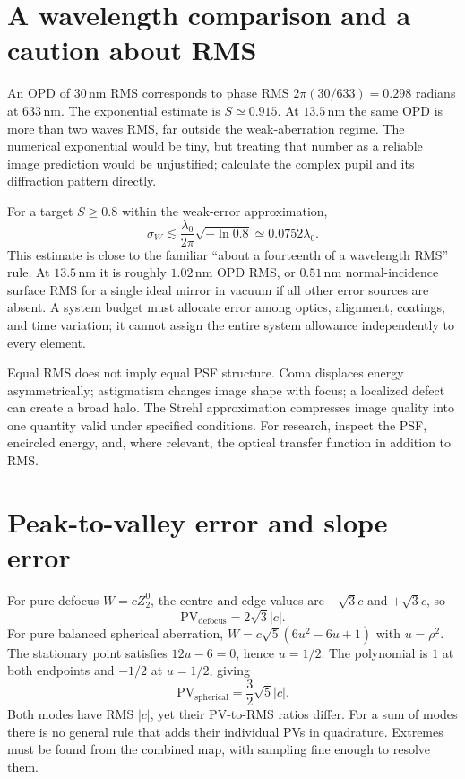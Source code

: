\section{A wavelength comparison and a caution about RMS}
An OPD of $30\,\mathrm{nm}$ RMS corresponds to phase RMS
$2\pi(30/633)=0.298$ radians at $633\,\mathrm{nm}$. The exponential
estimate is $S\simeq0.915$. At $13.5\,\mathrm{nm}$ the same OPD is
more than two waves RMS, far outside the weak-aberration regime.
The numerical exponential would be tiny, but treating that number as
a reliable image prediction would be unjustified; calculate the
complex pupil and its diffraction pattern directly.

For a target $S\geq0.8$ within the weak-error approximation,
\begin{equation}
 \sigma_W\lesssim\frac{\lambda_0}{2\pi}\sqrt{-\ln0.8}
                  \simeq0.0752\lambda_0.
\end{equation}
This estimate is close to the familiar ``about a fourteenth of a
wavelength RMS'' rule. At $13.5\,\mathrm{nm}$ it is roughly
$1.02\,\mathrm{nm}$ OPD RMS, or $0.51\,\mathrm{nm}$ normal-incidence
surface RMS for a single ideal mirror in vacuum if all other error
sources are absent. A system budget must allocate error among optics,
alignment, coatings, and time variation; it cannot assign the entire
system allowance independently to every element.

Equal RMS does not imply equal PSF structure. Coma displaces energy
asymmetrically; astigmatism changes image shape with focus; a localized
defect can create a broad halo. The Strehl approximation compresses
image quality into one quantity valid under specified conditions.
For research, inspect the PSF, encircled energy, and, where relevant,
the optical transfer function in addition to RMS.

\section{Peak-to-valley error and slope error}
For pure defocus $W=cZ_2^0$, the centre and edge values are
$-\sqrt3c$ and $+\sqrt3c$, so
\begin{equation}
 \mathrm{PV}_{\mathrm{defocus}}=2\sqrt3|c|.
\end{equation}
For pure balanced spherical aberration,
$W=c\sqrt5(6u^2-6u+1)$ with $u=\rho^2$. The stationary point
satisfies $12u-6=0$, hence $u=1/2$. The polynomial is $1$ at both
endpoints and $-1/2$ at $u=1/2$, giving
\begin{equation}
 \mathrm{PV}_{\mathrm{spherical}}=\frac32\sqrt5|c|.
\end{equation}
Both modes have RMS $|c|$, yet their PV-to-RMS ratios differ. For a
sum of modes there is no general rule that adds their individual PVs
in quadrature. Extremes must be found from the combined map, with
sampling fine enough to resolve them.

